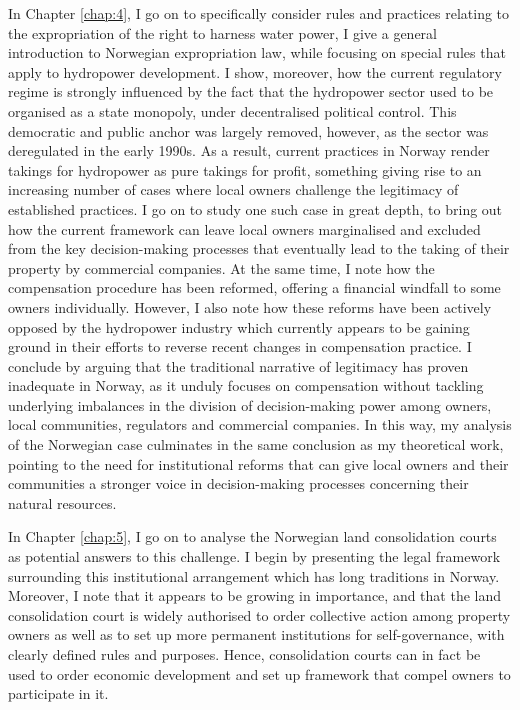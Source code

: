 \documentclass{article} %
\begin{document}
In Chapter \ref{chap:4}, I go on to specifically consider rules and practices relating to the expropriation of the right to harness water power, I give a general introduction to Norwegian expropriation law, while focusing on special rules that apply to hydropower development. I show, moreover, how the current regulatory regime is strongly influenced by the fact that the hydropower sector used to be organised as a state monopoly, under decentralised political control. This democratic and public anchor was largely removed, however, as the sector was deregulated in the early 1990s. As a result, current practices in Norway render takings for hydropower as pure takings for profit, something giving rise to an increasing number of cases where local owners challenge the legitimacy of established practices. I go on to study one such case in great depth, to bring out how the current framework can leave local owners marginalised and excluded from the key decision-making processes that eventually lead to the taking of their property by commercial companies. At the same time, I note how the compensation procedure has been reformed, offering a financial windfall to some owners individually. However, I also note how these reforms have been actively opposed by the hydropower industry which currently appears to be gaining ground in their efforts to reverse recent changes in compensation practice. I conclude by arguing that the traditional narrative of legitimacy has proven inadequate in Norway, as it unduly focuses on compensation without tackling underlying imbalances in the division of decision-making power among owners, local communities, regulators and commercial companies. In this way, my analysis of the Norwegian case culminates in the same conclusion as my theoretical work, pointing to the need for institutional reforms that can give local owners and their communities a stronger voice in decision-making processes concerning their natural resources.

In Chapter \ref{chap:5}, I go on to analyse the Norwegian land consolidation courts as potential answers to this challenge. I begin by presenting the legal framework surrounding this institutional arrangement which has long traditions in Norway. Moreover, I note that it appears to be growing in importance, and that the land consolidation court is widely authorised to order collective action among property owners as well as to set up more permanent institutions for self-governance, with clearly defined rules and purposes. Hence, consolidation courts can in fact be used to order economic development and set up framework that compel owners to participate in it. 
\end{document}
